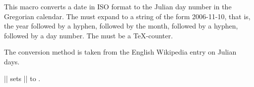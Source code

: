 \begin{command}{\pgfcalendardatetojulian{}}
  This macro converts a date in ISO format to the Julian day number in
  the Gregorian calendar. The  must expand to a string of the form
  2006-11-10, that is, the year followed by a hyphen, followed by the
  month, followed by a hyphen, followed by a day number. The
   must be a \TeX-counter. 
  
  The conversion method is taken from the English Wikipedia entry on
  Julian days. 

  \newcount\mycount
  \example || sets
  |\mycount| to \the\mycount.
\end{command}

\begin{command}{\pgfcalendarjuliantodate{}}
  
\end{command}

\begin{command}{\pgfcalendarjuliantoweekday{}}
  
\end{command}


\begin{command}{\pgfcalendarweekdayname{}}
  
\end{command}


\begin{command}{\pgfcalendarweekdayshortname{}}
  
\end{command}


\begin{command}{\pgfcalendarmonthname{}}
  
\end{command}


\begin{command}{\pgfcalendarmonthshortname{}}
  
\end{command}

\begin{command}{\pgfcalendarnoleadingzero{}}
  
\end{command}




